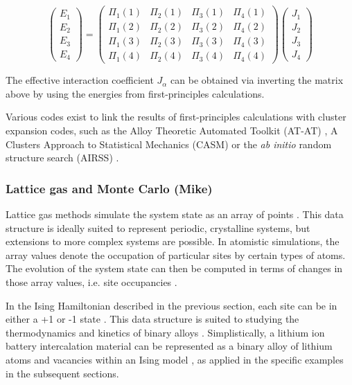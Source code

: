 \documentclass[../main.tex]{subfiles}
\begin{document}
\begin{equation}
{\left( \begin{array}{cccc}
{E_1}\\
{E_2}\\
{E_3}\\
{E_4}
\end{array}\right)}=
{\left( \begin{array}{cccc}
{\Pi_1}(1) & {\Pi_2}(1) & {\Pi_3}(1) & {\Pi_4}(1) \\
{\Pi_1}(2) & {\Pi_2}(2) & {\Pi_3}(2) & {\Pi_4}(2)  \\
{\Pi_1}(3) & {\Pi_2}(3) & {\Pi_3}(3) & {\Pi_4}(3)  \\
{\Pi_1}(4) & {\Pi_2}(4) & {\Pi_3}(4) & {\Pi_4}(4) 
\end{array}\right)}
{\left(\begin{array}{cccc}
{J_1}\\
{J_2}\\
{J_3}\\
{J_4}
\end{array}\right)}
\end{equation}

The effective interaction coefficient $J_\alpha$ can be obtained via inverting the matrix above by using the energies from first-principles calculations. 

Various codes exist to link the results of first-principles calculations with cluster expansion codes, such as the Alloy Theoretic Automated Toolkit (AT-AT) \cite{avdw:atat2,avdw:atat,avdw:maps},  A Clusters Approach to Statistical Mechanics (CASM) \cite{natarajan2017} or the \textit{ab initio} random structure search (AIRSS) \cite{Pickard_2011}.


\subsubsection{Lattice gas and Monte Carlo (Mike)}
\label{sec:monte_carlo}

Lattice gas methods simulate the system state as an array of points \cite{Binder2009book}. This data structure is ideally suited to represent periodic, crystalline systems, but extensions to more complex systems are possible. In atomistic simulations, the array values denote the occupation of particular sites by certain types of atoms. The evolution of the system state can then be computed in terms of changes in those array values, i.e. site occupancies \cite{Binder2009book}.
    
In the Ising Hamiltonian described in the previous section, each site can be in either a +1 or -1 state \cite{lee1952}. This data structure is suited to studying the thermodynamics and kinetics of binary alloys \cite{PMERCER2016394,oviedo2015underpotential}. Simplistically, a lithium ion battery intercalation material can be represented as a binary alloy of lithium atoms and vacancies within an Ising model \cite{persson2010,mercer_influence_2017,Kim2001ThermodynamicAK}, as applied in the specific examples in the subsequent sections.  
    
\end{document}

